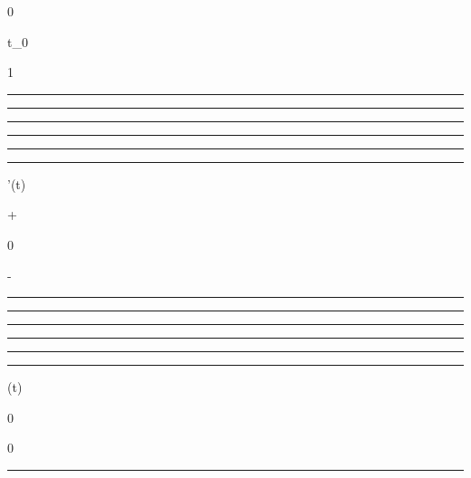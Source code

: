 0

t_0

1

\begin{center}\rule{3in}{0.4pt}\end{center}

\begin{center}\rule{3in}{0.4pt}\end{center}

\begin{center}\rule{3in}{0.4pt}\end{center}

\begin{center}\rule{3in}{0.4pt}\end{center}

\begin{center}\rule{3in}{0.4pt}\end{center}

\begin{center}\rule{3in}{0.4pt}\end{center}

\phi'(t)

+

0

-

\begin{center}\rule{3in}{0.4pt}\end{center}

\begin{center}\rule{3in}{0.4pt}\end{center}

\begin{center}\rule{3in}{0.4pt}\end{center}

\begin{center}\rule{3in}{0.4pt}\end{center}

\begin{center}\rule{3in}{0.4pt}\end{center}

\begin{center}\rule{3in}{0.4pt}\end{center}

\phi(t)

0

\nearrow

\searrow

0

\begin{center}\rule{3in}{0.4pt}\end{center}


